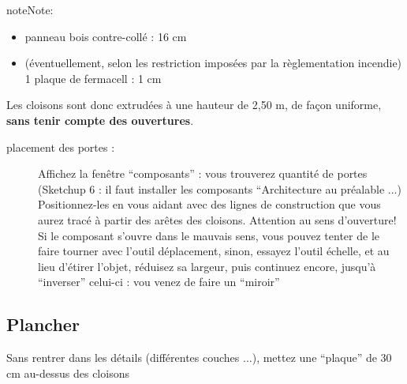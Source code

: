 \documentclass[a4paper,12pt,french]{sphinxmanual}
\begin{document}
\begin{notice}{note}{Note:}
\begin{description}
\begin{itemize}
\begin{description}
\begin{itemize}
\begin{description}
\begin{itemize}
\end{itemize}

\end{description}

\item {} 
panneau bois contre-collé : 16 cm

\item {} 
(éventuellement, selon les restriction imposées par la règlementation incendie)  1 plaque de fermacell : 1 cm

\end{itemize}

\end{description}

\end{itemize}

\end{description}
\end{notice}

Les cloisons sont donc extrudées à une hauteur de 2,50 m, de façon uniforme, \textbf{sans tenir compte des ouvertures}.
\begin{description}
\item[{placement des portes :}] \leavevmode
Affichez la fenêtre ``composants'' : vous trouverez quantité de portes (Sketchup 6 : il faut installer les composants ``Architecture au préalable ...)
Positionnez-les en vous aidant avec des lignes de construction que vous aurez tracé à partir des arêtes des cloisons.
Attention au sens d'ouverture! Si le composant s'ouvre dans le mauvais sens, vous pouvez tenter de le faire tourner avec l'outil déplacement, sinon, essayez l'outil échelle, et au lieu d'étirer l'objet, réduisez sa largeur, puis continuez encore, jusqu'à ``inverser'' celui-ci : vou venez de faire un ``miroir''

\end{description}


\subsection{Plancher}
\label{init_su+acad/su1:plancher}
Sans rentrer dans les détails (différentes couches ...), mettez une ``plaque'' de 30 cm au-dessus des cloisons
\end{document}
